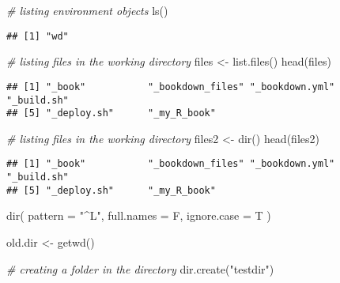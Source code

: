 \documentclass[
]{book}
\newenvironment{Shaded}{\begin{snugshade}}{\end{snugshade}}
\newcommand{\AttributeTok}[1]{\textcolor[rgb]{0.77,0.63,0.00}{#1}}
\newcommand{\CommentTok}[1]{\textcolor[rgb]{0.56,0.35,0.01}{\textit{#1}}}
\newcommand{\FunctionTok}[1]{\textcolor[rgb]{0.00,0.00,0.00}{#1}}
\newcommand{\NormalTok}[1]{#1}
\newcommand{\OtherTok}[1]{\textcolor[rgb]{0.56,0.35,0.01}{#1}}
\newcommand{\StringTok}[1]{\textcolor[rgb]{0.31,0.60,0.02}{#1}}
\begin{document}
\begin{Shaded}
\begin{Highlighting}[]
\CommentTok{\# listing environment objects}
\FunctionTok{ls}\NormalTok{()}
\end{Highlighting}
\end{Shaded}

\begin{verbatim}
## [1] "wd"
\end{verbatim}

\begin{Shaded}
\begin{Highlighting}[]
\CommentTok{\# listing files in the working directory}
\NormalTok{files }\OtherTok{\textless{}{-}} \FunctionTok{list.files}\NormalTok{()}
\FunctionTok{head}\NormalTok{(files)}
\end{Highlighting}
\end{Shaded}

\begin{verbatim}
## [1] "_book"           "_bookdown_files" "_bookdown.yml"   "_build.sh"      
## [5] "_deploy.sh"      "_my_R_book"
\end{verbatim}

\begin{Shaded}
\begin{Highlighting}[]
\CommentTok{\# listing files in the working directory}
\NormalTok{files2 }\OtherTok{\textless{}{-}} \FunctionTok{dir}\NormalTok{()}
\FunctionTok{head}\NormalTok{(files2)}
\end{Highlighting}
\end{Shaded}

\begin{verbatim}
## [1] "_book"           "_bookdown_files" "_bookdown.yml"   "_build.sh"      
## [5] "_deploy.sh"      "_my_R_book"
\end{verbatim}

\begin{Shaded}
\begin{Highlighting}[]
\FunctionTok{dir}\NormalTok{( }\AttributeTok{pattern =} \StringTok{"\^{}L"}\NormalTok{, }\AttributeTok{full.names =}\NormalTok{ F, }\AttributeTok{ignore.case =}\NormalTok{ T )}
\end{Highlighting}
\end{Shaded}

\begin{Shaded}
\begin{Highlighting}[]
\NormalTok{old.dir }\OtherTok{\textless{}{-}} \FunctionTok{getwd}\NormalTok{()}

\CommentTok{\# creating a folder in the directory}
\FunctionTok{dir.create}\NormalTok{(}\StringTok{"testdir"}\NormalTok{)}
\end{Highlighting}
\end{Shaded}
\end{document}
